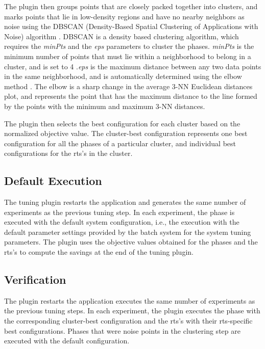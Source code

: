 The plugin then groups points that are closely packed together into clusters, and marks points that lie in low-density regions and have no nearby neighbors as noise using the DBSCAN (Density-Based Spatial Clustering of Applications with Noise) algorithm . DBSCAN is a density based clustering algorithm, which requires the \textit{minPts} and the \textit{eps} parameters to cluster the phases. \textit{minPts} is the minimum number of points that must lie within a neighborhood to belong in a cluster, and is set to 4 .\textit{eps} is the maximum distance between any two data points in the same neighborhood, and is automatically determined using the elbow method . The elbow is a sharp change in the average 3-NN Euclidean distances plot, and represents the point that has the maximum distance to the line formed by the points with the minimum and maximum 3-NN distances.

The plugin then selects the best configuration for each cluster based on the normalized objective value. The cluster-best configuration represents one best configuration for all the phases of a particular cluster, and individual best configurations for the rts's in the cluster.

\subsection{Default Execution} \label{default-execution}
The tuning plugin restarts the application and generates the same number of experiments as the previous tuning step. In each experiment, the phase is executed with the default system configuration, i.e., the execution with the default parameter settings provided by the batch system for the system tuning parameters. The plugin uses the objective values obtained for the phases and the rts’s to compute the savings at the end of the tuning plugin.

\subsection{Verification} \label{verification}
The plugin restarts the application executes the same number of experiments as the previous tuning steps. In each experiment, the plugin executes the phase with the
corresponding cluster-best configuration and the rts's with their rts-specific
best configurations. Phases that were noise points in the clustering step are executed with the default configuration.

